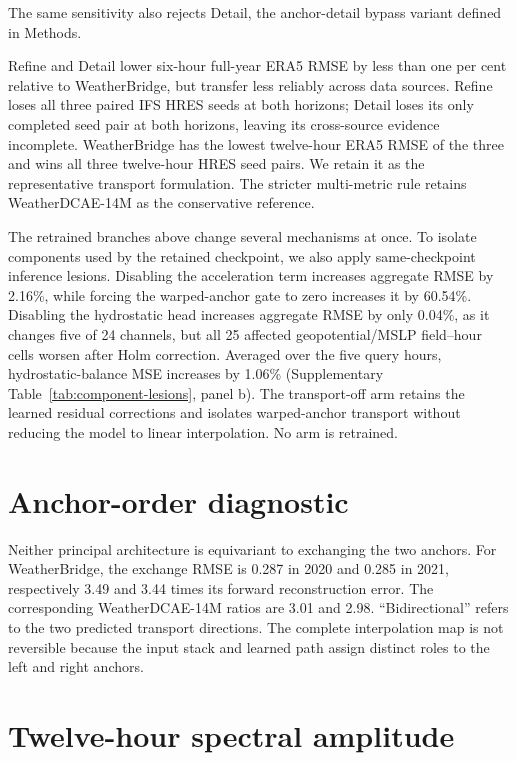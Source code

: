 \documentclass[referee,pdflatex,sn-nature]{sn-jnl}
\begin{document}
The same sensitivity also rejects Detail, the anchor-detail bypass variant
defined in Methods.

Refine and Detail lower six-hour full-year ERA5 RMSE by less than one per cent
relative to WeatherBridge, but transfer less reliably across data sources.
Refine loses all three paired IFS HRES seeds at both horizons; Detail loses its
only completed seed pair at both horizons, leaving its cross-source evidence
incomplete. WeatherBridge has the lowest twelve-hour ERA5 RMSE of the three and
wins all three twelve-hour HRES seed pairs. We retain it as the representative
transport formulation. The stricter multi-metric rule retains
WeatherDCAE-14M as the conservative reference.

The retrained branches above change several mechanisms at once. To isolate
components used by the retained checkpoint, we also apply
same-checkpoint inference lesions. Disabling the acceleration term increases
aggregate RMSE by 2.16\%, while forcing the warped-anchor gate to zero
increases it by 60.54\%. Disabling the hydrostatic head increases aggregate
RMSE by only 0.04\%, as it changes five of 24 channels, but all 25 affected
geopotential/MSLP field--hour cells worsen after Holm correction. Averaged
over the five query hours, hydrostatic-balance MSE increases by 1.06\%
(Supplementary Table~\ref{tab:component-lesions}, panel b). The transport-off arm
retains the learned residual corrections and isolates warped-anchor transport
without reducing the model to linear interpolation. No arm is retrained.



\FloatBarrier
\section{Anchor-order diagnostic}

Neither principal architecture is equivariant to exchanging the two anchors.
For WeatherBridge, the exchange RMSE is 0.287 in 2020 and 0.285 in 2021,
respectively 3.49 and 3.44 times its forward reconstruction error. The
corresponding WeatherDCAE-14M ratios are 3.01 and 2.98. ``Bidirectional''
refers to the two predicted transport directions. The complete interpolation
map is not reversible because the input stack and learned path assign distinct
roles to the left and right anchors.



\FloatBarrier
\section{Twelve-hour spectral amplitude}
\end{document}
